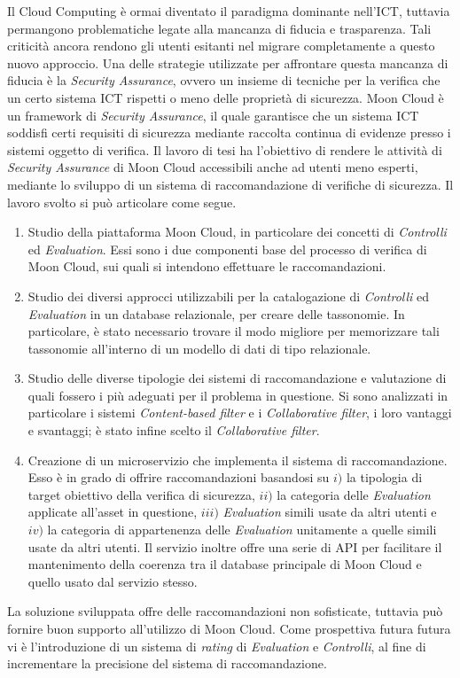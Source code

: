 \documentclass[10pt,a4paper]{article}
\begin{document}
\hfill\break
Il Cloud Computing è ormai diventato il paradigma dominante nell'ICT, tuttavia permangono problematiche legate alla mancanza di fiducia e trasparenza.
Tali criticità ancora rendono gli utenti esitanti nel migrare completamente a questo nuovo approccio.
Una delle strategie utilizzate per affrontare questa mancanza di fiducia è la \textit{Security Assurance}, ovvero un insieme di tecniche
per la verifica che un certo sistema ICT rispetti o meno delle proprietà di sicurezza.\hfill\break 
%
Moon Cloud è un framework di \textit{Security Assurance}, il quale garantisce che un sistema ICT soddisfi certi requisiti di sicurezza mediante 
raccolta continua di evidenze presso i sistemi oggetto di verifica.
%
Il lavoro di tesi ha l'obiettivo di rendere le attività di \textit{Security Assurance} di Moon Cloud accessibili anche ad utenti meno esperti,
mediante lo sviluppo di un sistema di raccomandazione di verifiche di sicurezza. Il lavoro svolto si può articolare come segue.
\begin{enumerate}
    \item Studio della piattaforma Moon Cloud, in particolare dei concetti di \textit{Controlli} ed \textit{Evaluation}.
    Essi sono i due componenti base del processo di verifica di Moon Cloud, sui quali si intendono effettuare le raccomandazioni.
    \item Studio dei diversi approcci utilizzabili per la catalogazione di \textit{Controlli} ed \textit{Evaluation} in un database
    relazionale, per creare delle tassonomie. In particolare, è stato necessario trovare il modo migliore per memorizzare tali tassonomie all'interno
    di un modello di dati di tipo relazionale.
    \item Studio delle diverse tipologie dei sistemi di raccomandazione e valutazione di quali fossero i più adeguati per il problema in questione.
    Si sono analizzati in particolare i sistemi \textit{Content-based filter} e i \textit{Collaborative filter}, i loro vantaggi e svantaggi; è
    stato infine scelto il \textit{Collaborative filter}.

    \item Creazione di un microservizio che implementa il sistema di raccomandazione. Esso è in grado di offrire raccomandazioni basandosi
    su $i)$ la tipologia di target obiettivo della verifica di sicurezza, $ii)$ la categoria delle \textit{Evaluation} applicate all’asset in questione, $iii)$ 
    \textit{Evaluation} simili usate da altri utenti e $iv)$ la categoria di appartenenza delle \textit{Evaluation} unitamente a quelle simili usate da altri utenti.
    Il servizio inoltre offre una serie di API per facilitare il mantenimento della coerenza tra il database principale di Moon Cloud e quello
    usato dal servizio stesso.
\end{enumerate}
%
La soluzione sviluppata offre delle raccomandazioni non sofisticate, tuttavia può fornire buon supporto all'utilizzo di Moon Cloud. Come prospettiva futura futura
vi è l'introduzione di un sistema di \textit{rating} di \textit{Evaluation} e \textit{Controlli}, al fine di incrementare la precisione del sistema di raccomandazione.
\end{document}
